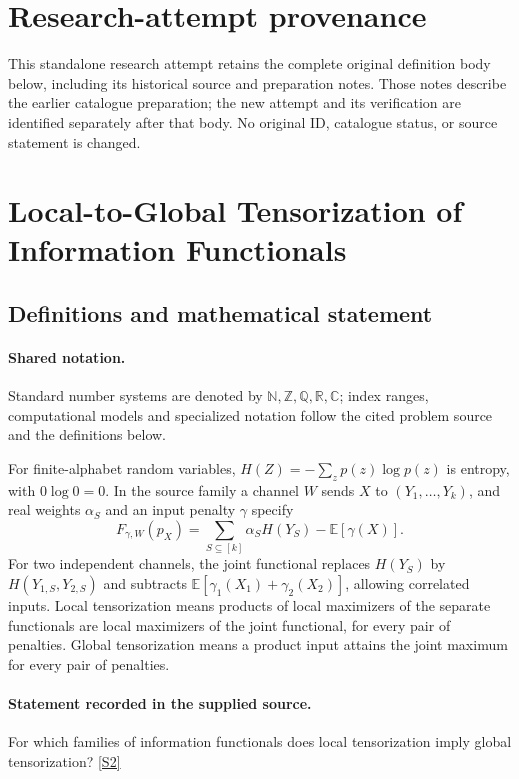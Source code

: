 \documentclass[11pt]{article}
\begin{document}
\section*{Research-attempt provenance}
This standalone research attempt retains the complete original definition body below,
including its historical source and preparation notes. Those notes describe the
earlier catalogue preparation; the new attempt and its verification are identified
separately after that body. No original ID, catalogue status, or source statement is changed.

\section{Local-to-Global Tensorization of Information Functionals}\label{statement}

\subsection{Definitions and mathematical statement}

\paragraph{Shared notation.}Standard number systems are denoted by $\mathbb N,\mathbb Z,\mathbb Q,\mathbb R,\mathbb C$; index ranges, computational models and specialized notation follow the cited problem source and the definitions below.


For finite-alphabet random variables, $H(Z)=-\sum_z p(z)\log p(z)$ is entropy, with $0\log0=0$. In the source family a channel $W$ sends $X$ to $(Y_1,\ldots,Y_k)$, and real weights $\alpha_S$ and an input penalty $\gamma$ specify
\[F_{\gamma,W}(p_X)=\sum_{S\subseteq[k]}\alpha_S H(Y_S)-\mathbb E[\gamma(X)].\]
For two independent channels, the joint functional replaces $H(Y_S)$ by $H(Y_{1,S},Y_{2,S})$ and subtracts $\mathbb E[\gamma_1(X_1)+\gamma_2(X_2)]$, allowing correlated inputs. Local tensorization means products of local maximizers of the separate functionals are local maximizers of the joint functional, for every pair of penalties. Global tensorization means a product input attains the joint maximum for every pair of penalties.
\paragraph{Statement recorded in the supplied source.}
For which families of information functionals does local tensorization imply global tensorization? \href{https://doi.org/10.4171/owr/2022/14}{[S2]}
\end{document}
